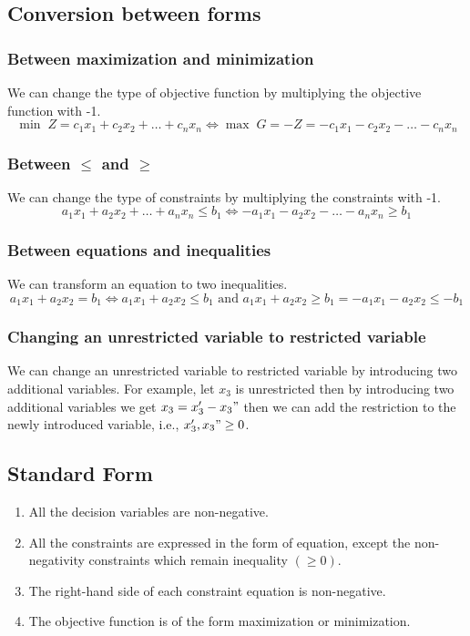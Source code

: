 \documentclass[../main-sheet.tex]{subfiles}
\begin{document}
\subsection{Conversion between forms}
\subsubsection{Between maximization and minimization}
We can change the type of objective function by multiplying the objective function with -1.
\[
    \min\; Z=c_1x_1+c_2x_2+\dots+c_nx_n\Leftrightarrow \max\; G=-Z=-c_1x_1-c_2x_2-\dots-c_nx_n
\]
\subsubsection{Between \(\leq\) and \(\geq\)}
We can change the type of constraints by multiplying the constraints with -1.
\[
    a_1x_1+a_2x_2+\dots+a_nx_n\leq b_1 \Leftrightarrow -a_1x_1-a_2x_2-\dots-a_nx_n\geq b_1
\]
\subsubsection{Between equations and inequalities}
We can transform an equation to two inequalities.
\[
    a_1x_1+a_2x_2=b_1 \Leftrightarrow a_1x_1+a_2x_2\leq b_1 \text{ and } a_1x_1+a_2x_2\geq b_1 =-a_1x_1-a_2x_2\leq -b_1
\]
\subsubsection{Changing an unrestricted variable to restricted variable}
We can change an unrestricted variable to restricted variable by introducing two additional variables. For example, let \(x_3\) is unrestricted then by introducing two additional variables we get \(x_3=x_3'-x_3"\) then we can add the restriction to the newly introduced variable, i.e., \(x_3',x_3"\geq 0\).
\subsection{Standard Form}
\begin{enumerate}
    \item All the decision variables are non-negative.
    \item All the constraints are expressed in the form of equation, except the non-negativity constraints which remain inequality \((\geq0)\).
    \item The right-hand side of each constraint equation is non-negative.
    \item The objective function is of the form maximization or minimization.
\end{enumerate}
\end{document}
